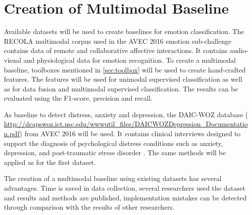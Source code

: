 


\section{Creation of Multimodal Baseline}

Available datasets will be used to create baselines for emotion classification. The RECOLA multimodal corpus used in the AVEC 2016 emotion sub-challenge contains data of remote and collaborative affective interactions. It contains audio-visual and physiological data for emotion recognition. To create a multimodal baseline, toolboxes mentioned in \ref{sec:toolbox} will be used to create hand-crafted features. The features will be used for unimodal supervised classification as well as for data fusion and multimodal supervised classification.  The results can be evaluated using the F1-score, precision and recall.

As baseline to detect distress, anxiety and depression, the DAIC-WOZ database ( \url{http://dcapswoz.ict.usc.edu/wwwutil_files/DAICWOZDepression_Documentation.pdf}) from AVEC 2016 will be used. It contains
clinical interviews designed to support the diagnosis of psychological
distress conditions such as anxiety, depression,
and post-traumatic stress disorder \cite{Valstar2016avec}. The same methods will be applied as for the first dataset.

The creation of a multimodal baseline using existing datasets has several advantages. Time is saved in data collection, several researchers used the dataset and results and methods are published, implementation mistakes can be detected through comparison with the results of other researchers.


